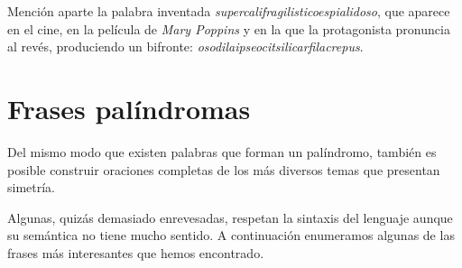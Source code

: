 \documentclass[10pt,a4paper]{article}
\begin{document}
	Mención aparte la palabra inventada \textit{supercalifragilisticoespialidoso}, que aparece en el cine, en la película de \textit{Mary Poppins} y en la que la protagonista pronuncia al revés, produciendo un bifronte: \textit{osodilaipseocitsilicarfilacrepus}.
	
	
	\section{Frases palíndromas}
	
	Del mismo modo que existen palabras que forman un palíndromo, también es posible construir oraciones completas de los más diversos temas que presentan simetría.
	
	Algunas, quizás demasiado enrevesadas, respetan la sintaxis del lenguaje aunque su semántica no tiene mucho sentido. A continuación enumeramos algunas de las frases más interesantes que hemos encontrado.
	
\end{document}
